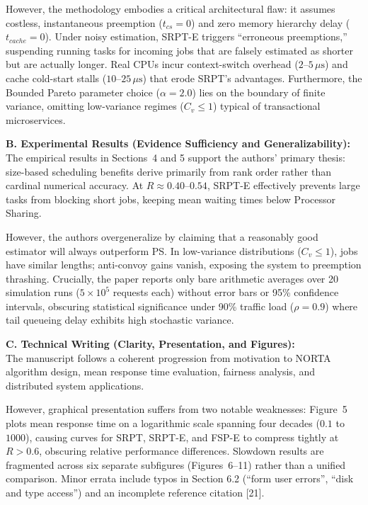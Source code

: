 \documentclass[11pt]{article}
\begin{document}
However, the methodology embodies a critical architectural flaw: it assumes costless, instantaneous preemption ($t_{cs}=0$) and zero memory hierarchy delay ($t_{cache}=0$). Under noisy estimation, SRPT-E triggers ``erroneous preemptions,'' suspending running tasks for incoming jobs that are falsely estimated as shorter but are actually longer. Real CPUs incur context-switch overhead ($2$--$5\,\mu\text{s}$) and cache cold-start stalls ($10$--$25\,\mu\text{s}$) that erode SRPT's advantages. Furthermore, the Bounded Pareto parameter choice ($\alpha=2.0$) lies on the boundary of finite variance, omitting low-variance regimes ($C_v \le 1$) typical of transactional microservices.

\vspace{0.4em}
\textbf{B. Experimental Results (Evidence Sufficiency and Generalizability):} \\
The empirical results in Sections~4 and 5 support the authors' primary thesis: size-based scheduling benefits derive primarily from rank order rather than cardinal numerical accuracy. At $R \approx 0.40$--$0.54$, SRPT-E effectively prevents large tasks from blocking short jobs, keeping mean waiting times below Processor Sharing. 

However, the authors overgeneralize by claiming that a reasonably good estimator will always outperform PS. In low-variance distributions ($C_v \le 1$), jobs have similar lengths; anti-convoy gains vanish, exposing the system to preemption thrashing. Crucially, the paper reports only bare arithmetic averages over 20 simulation runs ($5 \times 10^5$ requests each) without error bars or 95\% confidence intervals, obscuring statistical significance under 90\% traffic load ($\rho=0.9$) where tail queueing delay exhibits high stochastic variance.

\vspace{0.4em}
\textbf{C. Technical Writing (Clarity, Presentation, and Figures):} \\
The manuscript follows a coherent progression from motivation to NORTA algorithm design, mean response time evaluation, fairness analysis, and distributed system applications. 

However, graphical presentation suffers from two notable weaknesses: Figure~5 plots mean response time on a logarithmic scale spanning four decades ($0.1$ to $1000$), causing curves for SRPT, SRPT-E, and FSP-E to compress tightly at $R > 0.6$, obscuring relative performance differences. Slowdown results are fragmented across six separate subfigures (Figures~6--11) rather than a unified comparison. Minor errata include typos in Section 6.2 (``form user errors'', ``disk and type access'') and an incomplete reference citation [21].
\end{document}
